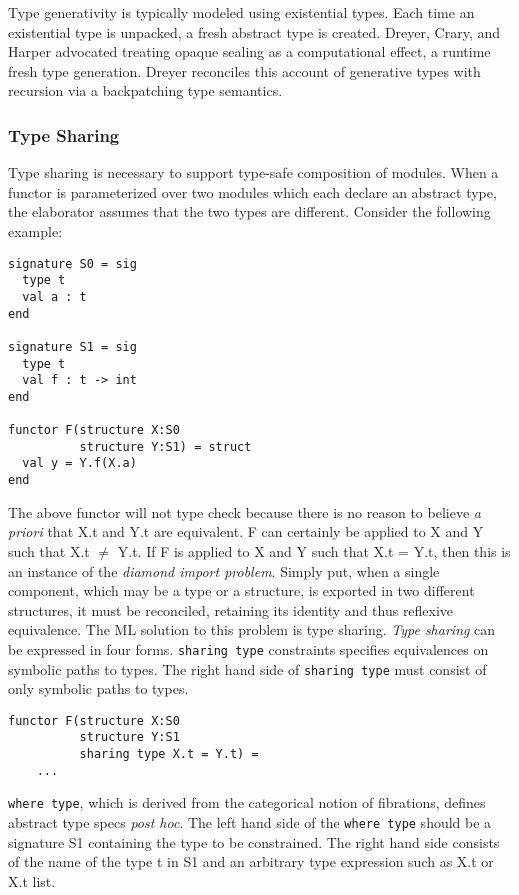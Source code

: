 Type generativity is typically modeled using existential types. Each time an existential type is unpacked, a fresh abstract type is created. Dreyer, Crary, and Harper \cite{dhc03} advocated treating opaque sealing as a computational effect, a runtime fresh type generation. Dreyer \cite{dreyer05} reconciles this account of generative types with recursion via a backpatching type semantics. 

\subsubsection{Type Sharing}
Type sharing is necessary to support type-safe composition of modules. When a functor is parameterized over two modules which each declare an abstract type, the elaborator assumes that the two types are different. Consider the following example:

\begin{lstlisting}
signature S0 = sig
  type t 
  val a : t
end

signature S1 = sig
  type t
  val f : t -> int
end

functor F(structure X:S0 
	      structure Y:S1) = struct
  val y = Y.f(X.a)
end	
\end{lstlisting}

The above functor will not type check because there is no reason to believe \emph{a priori} that X.t and Y.t are equivalent. F can certainly be applied to X and Y such that X.t $\ne$ Y.t. If F is applied to X and Y such that X.t = Y.t, then this is an instance of the \emph{diamond import problem}. Simply put, when a single component, which may be a type or a structure, is exported in two different structures, it must be reconciled, retaining its identity and thus reflexive equivalence. The ML solution to this problem is type sharing. \emph{Type sharing} can be expressed in four forms. \lstinline{sharing type} constraints specifies equivalences on symbolic paths to types. The right hand side of \lstinline{sharing type} must consist of only symbolic paths to types. 

\begin{lstlisting}
functor F(structure X:S0
	      structure Y:S1
	      sharing type X.t = Y.t) = 
	...	
\end{lstlisting} 

\lstinline{where type}, which is derived from the categorical notion of fibrations, defines abstract type specs \emph{post hoc}. The left hand side of the \lstinline{where type} should be a signature S1 containing the type to be constrained. The right hand side consists of the name of the type t in S1 and an arbitrary type expression such as X.t or X.t list. 

